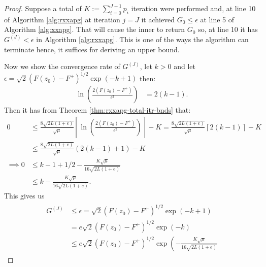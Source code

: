 \documentclass[12pt]{report}
\begin{document}
        \begin{proof}
            Suppose a total of $K := \sum_{i = 0}^{J - 1} p_i$ iteration were performed and, at line 10 of Algorithm \ref{alg:rxxapg} at iteration $j = J$ it achieved $G_0 \le \epsilon$ at line 5 of Algorithm \ref{alg:xxapg}. 
            That will cause the inner \XXAPG{} to return $G_0$ so, at line 10 it has $G^{(J)} < \epsilon$ in Algorithm \ref{alg:rxxapg}. 
            This is one of the ways the algorithm can terminate hence, it suffices for deriving an upper bound. 
            \par
            Now we show the convergence rate of $G^{(J)}$, let $k > 0$ and let $\epsilon = \sqrt{2}(F(z_0) - F^+)^{1/2}\exp(-k + 1)$ then: 
            \begin{align*}
                \ln \left(
                    \frac{2(F(z_0) - F^+)}{\epsilon^2}
                \right)
                &= 2(k - 1). 
            \end{align*}
            Then it has from Theorem \ref{thm:rxxapg-total-itr-bnds} that:
            \begin{align*}
                0 &\le 
                \frac{8\sqrt{2L(1 + e)}}{\sqrt{\mu}}\left\lceil 
                    \ln\left(
                        \frac{2(F(z_0) - F^+)}{\epsilon^2}
                    \right)
                \right\rceil - K
                =
                \frac{8\sqrt{2L(1 + e)}}{\sqrt{\mu}}\left\lceil 
                    2(k - 1)
                \right\rceil - K 
                \\
                &\le 
                \frac{8\sqrt{2L(1 + e)}}{\sqrt{\mu}} (2(k - 1) + 1) - K
                \\
                \implies
                0 &\le k - 1 + 1/2 - \frac{K\sqrt{\mu}}{16\sqrt{2L(1 + e)}}
                \\
                &\le k - \frac{K\sqrt{\mu}}{16\sqrt{2L(1 + e)}} .
            \end{align*}
            This gives us 
            \begin{align}
                \begin{split}
                    G^{(J)} &\le \epsilon = \sqrt{2}(F(z_0) - F^+)^{1/2}\exp(-k + 1)
                    \\
                    &=
                    e\sqrt{2}(F(z_0) - F^+)^{1/2}\exp(-k)
                    \\
                    &\le
                    e\sqrt{2}(F(z_0) - F^+)^{1/2}\exp\left(
                        - \frac{K\sqrt{\mu}}{16\sqrt{2L(1 + e)}}

\end{split}
\end{align}
\end{proof}
\end{document}
